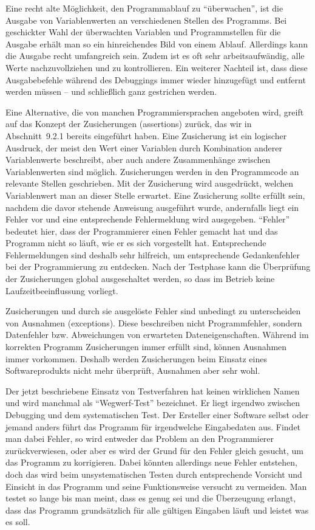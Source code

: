 Eine recht alte Möglichkeit, den Programmablauf zu "`überwachen"', ist die Ausgabe von Variablenwerten an verschiedenen Stellen des Programms. Bei geschickter Wahl der überwachten Variablen und Programmstellen für die Ausgabe erhält man so ein hinreichendes Bild von einem Ablauf. Allerdings kann die Ausgabe recht umfangreich sein. Zudem ist es oft sehr arbeitsaufwändig, alle Werte nachzuvollziehen und zu kontrollieren. Ein weiterer Nachteil ist, dass diese Ausgabebefehle während des Debuggings immer wieder hinzugefügt und entfernt werden müssen -- und schließlich ganz gestrichen werden.

Eine Alternative, die von manchen Programmiersprachen angeboten wird, greift auf das Konzept der Zusicherungen (assertions)
zurück, das wir in Abschnitt~9.2.1 %
bereits eingeführt haben. Eine Zusicherung ist ein logischer Ausdruck, der meist den Wert einer Variablen durch Kombination anderer Variablenwerte beschreibt, aber auch andere Zusammenhänge zwischen Variablenwerten sind möglich. Zusicherungen werden in den Programmcode an relevante Stellen geschrieben. Mit der Zusicherung wird ausgedrückt, welchen Variablenwert man an dieser Stelle erwartet. Eine Zusicherung sollte erfüllt sein, nachdem die davor stehende Anweisung ausgeführt wurde, andernfalls liegt ein Fehler vor und eine entsprechende Fehlermeldung wird ausgegeben. "`Fehler"' bedeutet hier, dass der Programmierer einen Fehler gemacht hat und das Programm nicht so läuft, wie er es sich vorgestellt hat. Entsprechende Fehlermeldungen sind deshalb sehr hilfreich, um entsprechende Gedankenfehler bei der Programmierung zu entdecken. Nach der Testphase kann die Überprüfung der Zusicherungen global ausgeschaltet werden, so dass im Betrieb keine Laufzeit\-beeinflussung vorliegt.

Zusicherungen und durch sie ausgelöste Fehler sind unbedingt zu unterscheiden von Ausnahmen (exceptions). Diese beschreiben nicht Programmfehler, sondern Datenfehler bzw. Abweichungen von erwarteten Dateneigenschaften. Während im korrekten Programm Zusicherungen immer erfüllt sind, können Ausnahmen immer vorkommen. Deshalb werden Zusicherungen beim Einsatz eines Softwareprodukts nicht mehr überprüft, Ausnahmen aber sehr wohl.

Der jetzt 
beschriebene Einsatz von Testverfahren hat keinen wirklichen Namen und wird manchmal als "`Wegwerf-Test"' bezeichnet. Er liegt irgendwo zwischen Debugging und dem systematischen Test. Der Ersteller einer Software selbst oder jemand anders führt das Programm für irgendwelche Eingabedaten aus. Findet man dabei Fehler, so wird entweder das Problem an den Programmierer zurückverwiesen, oder aber es wird der Grund für den Fehler gleich gesucht, um das Programm zu korrigieren. Dabei könnten allerdings neue Fehler entstehen, doch das wird beim unsystematischen Testen durch entsprechende Vorsicht und Einsicht in das Programm und seine Funktionsweise versucht zu vermeiden. Man testet so lange bis man meint, dass es genug sei und die Überzeugung erlangt, dass das Programm grundsätzlich für alle gültigen Eingaben läuft und leistet was es soll.

